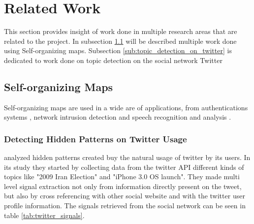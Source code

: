 \section{Related Work} %
\label{sec:related_work}

This section provides insight of work done in multiple research areas that are related to the project. In subsection \ref{sub:self_organizing_maps} will be described multiple work done using Self-organizing maps. Subsection \ref{sub:topic_detection_on_twitter} is dedicated to work done on topic detection on the social network Twitter \citep{Twitter}

\subsection{Self-organizing Maps} %
\label{sub:self_organizing_maps}
Self-organizing maps are used in a wide are of applications, from authentications systems \cite{Dozono2012}, network intrusion detection \cite{intrusion_som} and speech recognition and analysis \cite{phonetic_typewiter}.

\subsubsection{Detecting Hidden Patterns on Twitter Usage} %
\label{ssub:detecting_hidden_patterns_on_twitter_usage}

\citep{Cheong2010} analyzed hidden patterns created buy the natural usage of twitter by its users. In its study they started by collecting data from the twitter API different kinds of topics like "2009 Iran Election" and "iPhone 3.0 OS launch". They made multi level signal extraction not only from information directly present on the tweet, but also by cross referencing with other social website and with the twitter user profile information. The signals retrieved from the social network can be seen in table \ref{tab:twitter_signals}.

